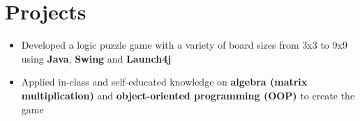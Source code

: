 \documentclass[12pt,letterpaper,sans]{moderncv}        %
\begin{document}



\vspace{-1.5em}


\section{Projects}
\begin{itemize}
  \item Developed a logic puzzle game with a variety of board sizes from 3x3 to 9x9 using \textbf{Java}, \textbf{Swing} and \textbf{Launch4j}
  \item Applied in-class and self-educated knowledge on \textbf{algebra (matrix multiplication)} and \textbf{object-oriented programming (OOP)} to create the game
\end{itemize}


\end{document}
